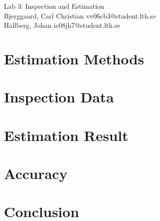 \documentclass[titlepage]{article}
\begin{document}
\begin{center}
	\huge{Lab 3: Inspection and Estimation } \\
	\small{Bjerggaard, Carl Christian vv06cb3@student.lth.se \\Hallberg, Johan ic08jh7@student.lth.se}

\vspace*{1cm}

\end{center}

\thispagestyle{empty}

\clearpage
\section{Estimation Methods}
\label{methods}

\section{Inspection Data}

\section{Estimation Result}

\section{Accuracy}

\section{Conclusion}

\end{document}
